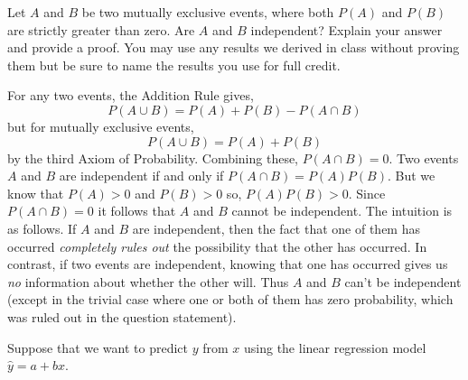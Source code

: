 \documentclass[addpoints,12pt]{exam}
\begin{document}
\begin{questions}
\question[10] Let $A$ and $B$ be two mutually exclusive events, where both $P(A)$ and $P(B)$ are strictly greater than zero. Are $A$ and $B$ independent? Explain your answer and provide a proof. You may use any results we derived in class without proving them but be sure to name the results you use for full credit.
			\begin{solution}[3in]
				For any two events, the Addition Rule gives,
					$$P(A\cup B) = P(A) + P(B) - P(A\cap B)$$
				but for mutually exclusive events,
					$$P(A \cup B) = P(A) + P(B)$$
				by the third Axiom of Probability. Combining these, $P(A \cap B) = 0$. Two events $A$ and $B$ are independent if and only if $P(A\cap B) = P(A)P(B)$. But we know that $P(A)>0$ and $P(B)>0$ so, $P(A)P(B)>0$. Since $P(A\cap B)=0$ it follows that $A$ and $B$ cannot be independent. The intuition is as follows.  If $A$ and $B$ are independent, then the fact that one of them has occurred \emph{completely rules out} the possibility that the other has occurred. In contrast, if two events are independent, knowing that one has occurred gives us \emph{no} information about whether the other will. Thus $A$ and $B$ can't be independent (except in the trivial case where one or both of them has zero probability, which was ruled out in the question statement).
			\end{solution}


\question
	Suppose that we want to predict $y$ from $x$ using the linear regression model $\widehat{y} = a + bx$.




\end{questions}
\end{document}
